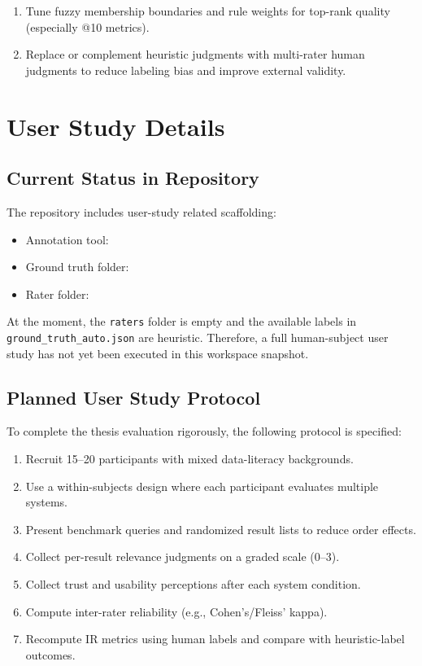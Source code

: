 \documentclass[11pt,a4paper]{article}
\begin{document}
\begin{enumerate}[leftmargin=1.5em]
  \item Tune fuzzy membership boundaries and rule weights for top-rank quality (especially @10 metrics).
  \item Replace or complement heuristic judgments with multi-rater human judgments to reduce labeling bias and improve external validity.
\end{enumerate}

\section{User Study Details}

\subsection{Current Status in Repository}

The repository includes user-study related scaffolding:
\begin{itemize}[leftmargin=1.5em]
  \item Annotation tool: \texttt{}
  \item Ground truth folder: \texttt{}
  \item Rater folder: \texttt{}
\end{itemize}

At the moment, the \texttt{raters} folder is empty and the available labels in \texttt{ground_truth_auto.json} are heuristic. Therefore, a full human-subject user study has not yet been executed in this workspace snapshot.

\subsection{Planned User Study Protocol}

To complete the thesis evaluation rigorously, the following protocol is specified:

\begin{enumerate}[leftmargin=1.5em]
  \item Recruit 15--20 participants with mixed data-literacy backgrounds.
  \item Use a within-subjects design where each participant evaluates multiple systems.
  \item Present benchmark queries and randomized result lists to reduce order effects.
  \item Collect per-result relevance judgments on a graded scale (0--3).
  \item Collect trust and usability perceptions after each system condition.
  \item Compute inter-rater reliability (e.g., Cohen's/Fleiss' kappa).
  \item Recompute IR metrics using human labels and compare with heuristic-label outcomes.
\end{enumerate}
\end{document}
